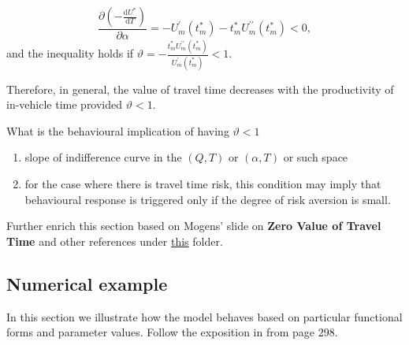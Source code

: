 \documentclass[12pt,a4paper,british]{article}
\makeatletter
\newenvironment{proof}[1][\proofname]{\par
    \normalfont\topsep6\p@\@plus6\p@\relax
    \trivlist
    \itemindent\parindent
    \item[\hskip\labelsep
          \scshape
      #1]\ignorespaces
  }{%
    \endtrivlist\@endpefalse
  }
\providecommand{\proofname}{Proof}
\makeatother
\begin{document}
\begin{proof}
\begin{casenv}
\begin{equation*}
\frac{\partial\left(-\frac{\mathrm{d}U^{\ast}}{\mathrm{d}T}\right)}{\partial\alpha}=-U_{m}^{\prime}\left(t_{m}^{\ast}\right)-t_{m}^{\ast}U_{m}^{\prime\prime}\left(t_{m}^{\ast}\right) < 0,
\end{equation*}
and the inequality holds if $\vartheta=-\frac{t_{m}^{\ast}U_{m}^{\prime\prime}\left(t_{m}^{\ast}\right)}{U_{m}^{\prime}\left(t_{m}^{\ast}\right)}<1$.
\end{casenv}
Therefore, in general, the value of travel time decreases with the productivity of in-vehicle time provided $\vartheta<1$.
\end{proof}

{\color{red} {What is the behavioural implication of having $\vartheta<1$}
\begin{enumerate}
    \item slope of indifference curve in the $(Q, T)$ or $(\alpha, T)$ or such space
    \item for the case where there is travel time risk, this condition may imply that behavioural response is triggered only if the degree of risk aversion is small.
\end{enumerate}}


Further enrich this section based on Mogens' slide on \textbf{Zero Value of Travel Time} and other references under \href{C:/Users/deab/Dropbox/Postdoc/automation_scheduling}{this} folder.


\subsection*{Numerical example}

In this section we illustrate how the model behaves based on particular functional forms and parameter values. Follow the exposition in \citet{Fosgerau_endogenousscheduling_2017} from page 298.
\end{document}
